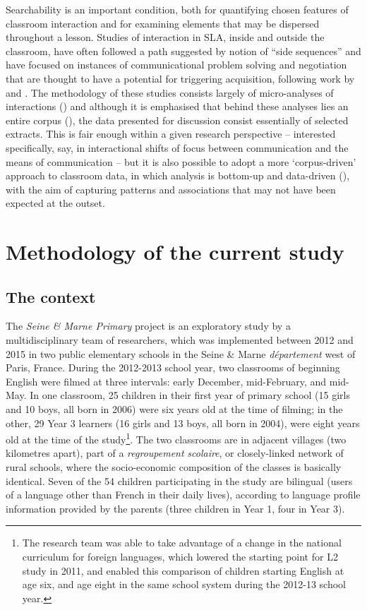 \documentclass[output=paper,colorlinks,citecolor=brown,modfonts,nonflat]{../langscibook}
\begin{document}
Searchability is an important condition, both for quantifying chosen features of classroom interaction and for examining elements that may be dispersed throughout a lesson. Studies of interaction in SLA, inside and outside the classroom, have often followed a path suggested by  notion of “side sequences” and have focused on instances of communicational problem solving and negotiation that are thought to have a potential for triggering acquisition, following work by \citet{PietroEtAl1989,Vasseur1989} and \citet{Bange1992}. The methodology of these studies consists largely of micro-analyses of interactions (\citealt[7]{Pekarek-Doehler2000}) and although it is emphasised that behind these analyses lies an entire corpus (\citealt[3]{ArdittyVasseur2005}), the data presented for discussion consist essentially of selected extracts. This is fair enough within a given research perspective – interested specifically, say, in interactional shifts of focus between communication and the means of communication – but it is also possible to adopt a more ‘corpus-driven’ approach to classroom data, in which analysis is bottom-up and data-driven (\citealt{Tognini-Bonelli2001,Seedhouse2005}), with the aim of capturing patterns and associations that may not have been expected at the outset.

\section{Methodology of the current study}
\subsection{The context}

The \textit{Seine \& Marne Primary} project is an exploratory study by a multidisciplinary team of researchers, which was implemented between 2012 and 2015 in two public elementary schools in the Seine \& Marne \textit{département} west of Paris, France. During the 2012-2013 school year, two classrooms of beginning English were filmed at three intervals: early December, mid-February, and mid-May. In one classroom, 25 children in their first year of primary school (15 girls and 10 boys, all born in 2006) were six years old at the time of filming; in the other, 29 Year 3 learners (16 girls and 13 boys, all born in 2004), were eight years old at the time of the study\footnote{The research team was able to take advantage of a change in the national curriculum for foreign languages, which lowered the starting point for L2 study in 2011, and enabled this comparison of children starting English at age six, and age eight in the same school system during the 2012-13 school year.}. The two classrooms are in adjacent villages (two kilometres apart), part of a \textit{regroupement} \textit{scolaire}, or closely-linked network of rural schools, where the socio-economic composition of the classes is basically identical. Seven of the 54 children participating in the study are bilingual (users of a language other than French in their daily lives), according to language profile information provided by the parents (three children in Year 1, four in Year 3).
\end{document}

